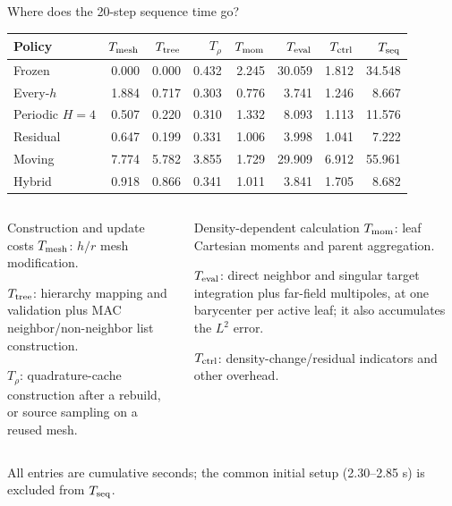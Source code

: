 \documentclass[aspectratio=169,11pt]{beamer}
\begin{document}
\begin{frame}{Where does the 20-step sequence time go?}
  \centering
  \scriptsize
  \setlength{\tabcolsep}{3.2pt}
  \renewcommand{\arraystretch}{1.12}
  \begin{tabular}{lrrrrrrr}
    \toprule
    Policy & $T_{\rm mesh}$ & $T_{\rm tree}$ & $T_{\rho}$ &
    $T_{\rm mom}$ & $T_{\rm eval}$ & $T_{\rm ctrl}$ & $T_{\rm seq}$\\
    \midrule
    Frozen       & 0.000 & 0.000 & 0.432 & 2.245 & 30.059 & 1.812 & 34.548\\
    Every-$h$    & 1.884 & 0.717 & 0.303 & 0.776 &  3.741 & 1.246 &  8.667\\
    Periodic $H=4$ & 0.507 & 0.220 & 0.310 & 1.332 &  8.093 & 1.113 & 11.576\\
    Residual     & 0.647 & 0.199 & 0.331 & 1.006 &  3.998 & 1.041 &  7.222\\
    Moving       & 7.774 & 5.782 & 3.855 & 1.729 & 29.909 & 6.912 & 55.961\\
    Hybrid       & 0.918 & 0.866 & 0.341 & 1.011 &  3.841 & 1.705 &  8.682\\
    \bottomrule
  \end{tabular}

  \vspace{0.18cm}
  \begin{columns}[T,onlytextwidth]
      \begin{block}{Construction and update costs}
        \scriptsize
        $T_{\rm mesh}$: $h/r$ mesh modification.\par
        $T_{\rm tree}$: hierarchy mapping and validation plus MAC
        neighbor/non-neighbor list construction.\par
        $T_{\rho}$: quadrature-cache construction after a rebuild, or source
        sampling on a reused mesh.
      \end{block}
      \begin{block}{Density-dependent calculation}
        \scriptsize
        $T_{\rm mom}$: leaf Cartesian moments and parent aggregation.\par
        $T_{\rm eval}$: direct neighbor and singular target integration plus
        far-field multipoles, at one barycenter per active leaf; it also
        accumulates the $L^2$ error.\par
        $T_{\rm ctrl}$: density-change/residual indicators and other overhead.
      \end{block}
  \end{columns}

  \vspace{0.04cm}
  {\scriptsize\color{muted}All entries are cumulative seconds; the common initial setup
  (2.30--2.85 s) is excluded from $T_{\rm seq}$.}
\end{frame}
\end{document}
